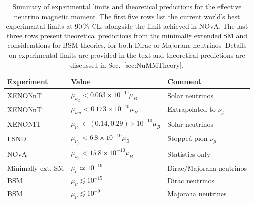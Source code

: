 \begin{table}[!ht]
\centering
\caption[Summary of experimental limits and theoretical predictions for the effective neutrino magnetic moment]{Summary of experimental limits and theoretical predictions for the effective neutrino magnetic moment. The first five rows list the current world’s best experimental limits at $\unit[90]{\%}$ \gls{CL}, alongside the limit achieved in \acrshort{NOvA}. The last three rows present theoretical predictions from the minimally extended \acrshort{SM} and considerations for \gls{BSM} theories, for both Dirac or Majorana neutrinos. Details on experimental limits are provided in the text and theoretical predictions are discussed in Sec.~\ref{sec:NuMMTheory}.}
\def\arraystretch{1.4}
\begin{tabular}{lll}
Experiment & Value & Comment\\\hline
XENONnT    & $\mu_{\nu_\odot}<0.063\times 10^{-10}\mu_B$ & Solar neutrinos\\
XENONnT    & $\mu_{\nu_\,u}<0.173\times 10^{-10}\mu_B$ & Extrapolated to $\nu_\mu$\\
XENON1T    & $\mu_{\nu_\odot}\in \left(0.14, 0.29\right)\times 10^{-10} \mu_B$ & Solar neutrinos\\
LSND       & $\mu_{\nu_\mu}<6.8\times 10^{-10}\mu_B$ & Stopped pion $\nu_\mu$\\
NOvA       & $\mu_{\nu_\mu}<15.8\times 10^{-10}\mu_B$ & Statistics-only\\\hline \hline
Minimally ext. \gls{SM} & $\mu_\nu\simeq 10^{-19}$ & Dirac/Majorana neutrinos\\
\gls{BSM} & $\mu_\nu\lesssim 10^{-15}$ & Dirac neutrinos\\
\gls{BSM} & $\mu_\nu\lesssim 10^{-9}$ & Majorana neutrinos\\\hline
\end{tabular}
\label{tab:NuMMExperimentalOverview}
\end{table}



